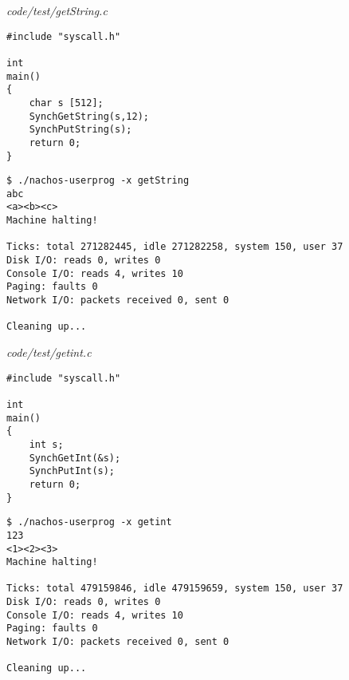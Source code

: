 \documentclass[a4paper,10pt]{article}
\begin{document}
\textit{code/test/getString.c}
\begin{lstlisting}
#include "syscall.h"

int
main()
{
	char s [512];
	SynchGetString(s,12);
	SynchPutString(s);
	return 0;
}
\end{lstlisting}

\begin{lstlisting}
$ ./nachos-userprog -x getString
abc
<a><b><c>
Machine halting!

Ticks: total 271282445, idle 271282258, system 150, user 37
Disk I/O: reads 0, writes 0
Console I/O: reads 4, writes 10
Paging: faults 0
Network I/O: packets received 0, sent 0

Cleaning up...
\end{lstlisting}

\textit{code/test/getint.c}
\begin{lstlisting}
#include "syscall.h"

int
main()
{
	int s;
	SynchGetInt(&s);
	SynchPutInt(s);
	return 0;
}
\end{lstlisting}

\begin{lstlisting}
$ ./nachos-userprog -x getint
123
<1><2><3>
Machine halting!

Ticks: total 479159846, idle 479159659, system 150, user 37
Disk I/O: reads 0, writes 0
Console I/O: reads 4, writes 10
Paging: faults 0
Network I/O: packets received 0, sent 0

Cleaning up...

\end{lstlisting}
\end{document}
